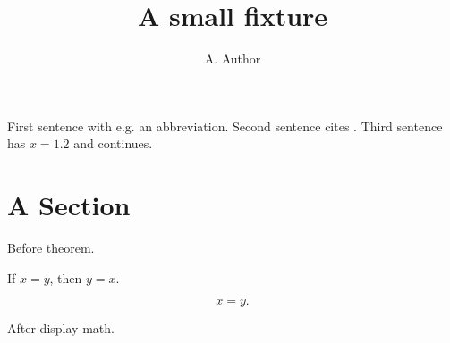 \documentclass{article}
\begin{document}
\title{A small fixture}
\author{A. Author}
\maketitle

First sentence with e.g. an abbreviation. Second sentence cites \citep[p. 12]{Source}. Third sentence has $x=1.2$ and continues.

\section{A Section}
\label{sec:a}

Before theorem.

\begin{theorem}
If $x=y$, then $y=x$.
\end{theorem}

\[
x=y.
\]

After display math.
\end{document}
